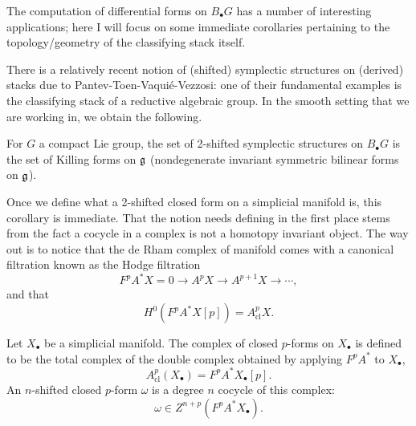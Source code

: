 \documentclass{amsart}
\begin{document}
The computation of differential forms on $B_\bullet G$ has a number of 
interesting applications; here I will focus on some immediate corollaries 
pertaining to the topology/geometry of the classifying stack itself.

There is a relatively recent notion of (shifted) symplectic structures on
(derived) stacks due to Pantev-Toen-Vaqui\'e-Vezzosi: one of their fundamental 
examples is the classifying stack of a reductive algebraic group. In the smooth 
setting that we are working in, we obtain the following.
\begin{corollary}
    For $G$ a compact Lie group,
    the set of 2-shifted symplectic structures on $B_\bullet G$ is the 
    set of Killing forms on $\mathfrak g$ (nondegenerate invariant symmetric
    bilinear forms on $\mathfrak g$).
\end{corollary}

Once we define what a 2-shifted closed form on a simplicial manifold is, this 
corollary is immediate. That the notion needs defining in the first place stems
from the fact a cocycle in a complex is not a homotopy 
invariant object. The way out is to notice that the de Rham complex of 
manifold comes with a canonical filtration known as the Hodge filtration
\begin{equation*}
    F^pA^*X = 0 \to A^pX \to A^{p+1}X \to \cdots,
\end{equation*}
and that
\begin{equation*}
    H^0(F^pA^*X[p]) = A^p_\text{cl}X.
\end{equation*}

\begin{definition}
    Let $X_\bullet$ be a simplicial manifold. The complex of closed $p$-forms on
    $X_\bullet$ is defined to be the total complex of the double complex 
    obtained by applying $F^pA^*$ to $X_\bullet$,
    \begin{equation*}
        A_\text{cl}^p(X_\bullet) = F^pA^*X_\bullet[p].
    \end{equation*}
    An $n$-shifted closed $p$-form $\omega$ is a degree $n$ cocycle of this
    complex:
    \begin{equation*}
        \omega \in Z^{n+p}(F^pA^*X_\bullet).
    \end{equation*}
\end{definition}
\end{document}
